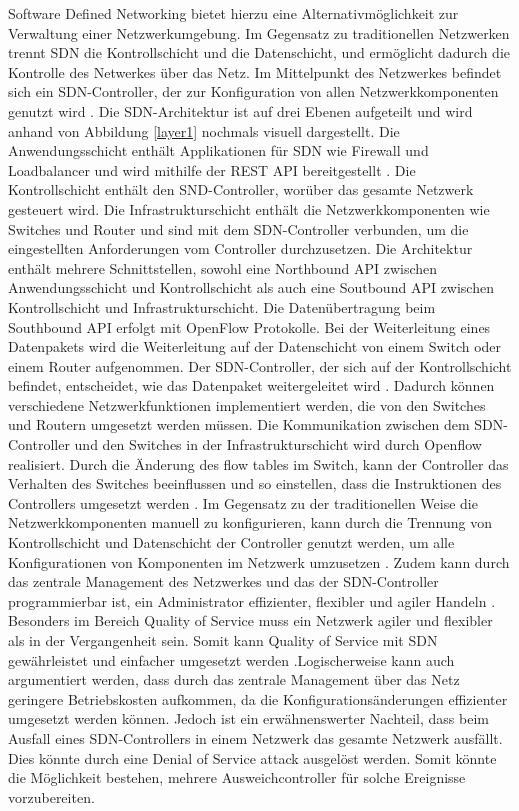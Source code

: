 \documentclass[fontsize=12pt,paper=a4,open=any,parskip=half,
  twoside=false,toc=listof,toc=bibliography,fleqn,leqno,
  captions=nooneline,captions=tableabove,british]{scrbook}
\begin{document}
Software Defined Networking bietet hierzu eine Alternativmöglichkeit zur Verwaltung einer Netzwerkumgebung. Im Gegensatz zu traditionellen Netzwerken trennt SDN die Kontrollschicht und die Datenschicht, und ermöglicht dadurch die Kontrolle des Netwerkes über das Netz. Im Mittelpunkt des Netzwerkes befindet sich ein SDN-Controller, der zur Konfiguration von allen Netzwerkkomponenten genutzt wird \cite{sdn1}. Die SDN-Architektur ist auf drei Ebenen aufgeteilt und wird anhand von Abbildung \ref{layer1} nochmals visuell dargestellt. Die Anwendungsschicht enthält Applikationen für SDN wie Firewall und Loadbalancer und wird mithilfe der REST API bereitgestellt \cite{james1}. Die Kontrollschicht enthält den SND-Controller, worüber das gesamte Netzwerk gesteuert wird. Die Infrastrukturschicht enthält die Netzwerkkomponenten wie Switches und Router und sind mit dem SDN-Controller verbunden, um die eingestellten Anforderungen vom Controller durchzusetzen. Die Architektur enthält mehrere Schnittstellen, sowohl eine Northbound API zwischen Anwendungsschicht und Kontrollschicht als auch eine Soutbound API zwischen Kontrollschicht und Infrastrukturschicht. Die Datenübertragung beim Southbound API erfolgt mit OpenFlow Protokolle. Bei der Weiterleitung eines Datenpakets wird die Weiterleitung auf der Datenschicht von einem Switch oder einem Router aufgenommen. Der SDN-Controller, der sich auf der Kontrollschicht befindet, entscheidet, wie das Datenpaket weitergeleitet wird \cite{james1}. Dadurch können verschiedene Netzwerkfunktionen implementiert werden, die von den Switches und Routern umgesetzt werden müssen. Die Kommunikation zwischen dem SDN-Controller und den Switches in der Infrastrukturschicht wird durch Openflow realisiert. Durch die Änderung des flow tables im Switch, kann der Controller das Verhalten des Switches beeinflussen und so einstellen, dass die Instruktionen des Controllers umgesetzt werden \cite{james1}. Im Gegensatz zu der traditionellen Weise die Netzwerkkomponenten manuell zu konfigurieren, kann durch die Trennung von Kontrollschicht und Datenschicht der Controller genutzt werden, um alle Konfigurationen von Komponenten im Netzwerk umzusetzen \cite{james3}. Zudem kann durch das zentrale Management des Netzwerkes und das der SDN-Controller programmierbar ist, ein Administrator effizienter, flexibler und agiler Handeln \cite{james1}. Besonders im Bereich Quality of Service muss ein Netzwerk agiler und flexibler als in der Vergangenheit sein. Somit kann Quality of Service mit SDN gewährleistet und einfacher umgesetzt werden \cite{james5}.Logischerweise kann auch argumentiert werden, dass durch das zentrale Management über das Netz geringere Betriebskosten aufkommen, da die Konfigurationsänderungen effizienter umgesetzt werden können.  Jedoch ist ein erwähnenswerter Nachteil, dass beim Ausfall eines SDN-Controllers in einem Netzwerk das gesamte Netzwerk ausfällt. Dies könnte durch eine Denial of Service attack ausgelöst werden. Somit könnte die Möglichkeit bestehen, mehrere Ausweichcontroller für solche Ereignisse vorzubereiten.
\end{document}
